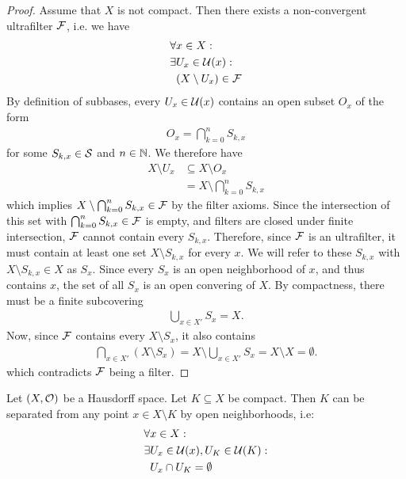 \begin{proof}
	Assume that $X$ is not compact. Then there exists a non-convergent ultrafilter $\mathcal{F}$, i.e. we have
	\begin{align*}
		\forall &x \in X :\\ 
		\exists &U_x \in \mathcal{U}(x) :\\
		&(X \setminus U_x) \in \mathcal{F}
	\end{align*}
	By definition of subbases, every $U_x \in \mathcal{U}(x)$ contains an open subset $O_x$ of the form
	\begin{align*}
		O_x = \bigcap_{k = 0}^n S_{k,x}
	\end{align*}
	for some $S_{k,x} \in \mathcal{S}$ and $n \in \mathbb{N}$.
	We therefore have
	\begin{align*}
		X \setminus U_x
		&\subseteq 
		X \setminus O_x\\
		&=
		X \setminus \bigcap_{k = 0}^n S_{k,x}
	\end{align*}
	which implies $X \setminus \bigcap_{k = 0}^n S_{k,x} \in \mathcal{F}$ by the filter axioms. Since the intersection of this set with $\bigcap_{k = 0}^n S_{k,x} \in \mathcal{F}$ is empty, and filters are closed under finite intersection, $\mathcal{F}$ cannot contain every $S_{k,x}$. Therefore, since $\mathcal{F}$ is an ultrafilter, it must contain at least one set $X \setminus S_{k,x}$ for every $x$. We will refer to these $S_{k,x}$ with $X \setminus S_{k,x} \in X$ as $S_x$. 
	\newpar
	Since every $S_x$ is an open neighborhood of $x$, and thus contains $x$, the set of all $S_x$ is an open convering of $X$. By compactness, there must be a finite subcovering 
	\begin{align*}
		\bigcup_{x \in X'} S_x = X.
	\end{align*} 
	Now, since $\mathcal{F}$ contains every $X \setminus S_x$, it also contains
	\begin{align*}
		\bigcap_{x \in X'} (X \setminus S_x) = X \setminus \bigcup_{x \in X'} S_x = X \setminus X = \emptyset.
	\end{align*}
	which contradicts $\mathcal{F}$ being a filter.
\end{proof}
\begin{lemma}
	Let $(X, \mathcal{O})$ be a Hausdorff space. Let $K \subseteq X$ be compact. Then $K$ can be separated from any point $x \in X \setminus K$ by open neighborhoods, i.e:
	\begin{align*}
		\forall &x \in X:\\
		\exists &U_x \in \mathcal{U}(x), U_K \in \mathcal{U}(K):\\
		&U_x \cap U_K = \emptyset
	\end{align*}
\end{lemma}
